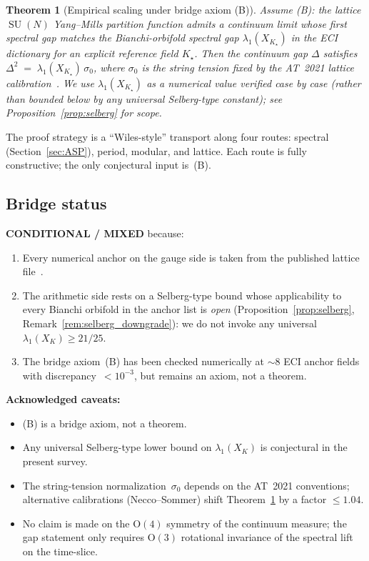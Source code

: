 \documentclass[11pt,a4paper]{article}
\newtheorem{theorem}{Theorem}[section]
\theoremstyle{definition}
\DeclareMathOperator{\SU}{SU}
\begin{document}
\begin{theorem}[Empirical scaling under bridge axiom (B)]
\label{thm:YMA}
Assume (B): the lattice $\SU(N)$ Yang--Mills partition function admits
a continuum limit whose first spectral gap matches the Bianchi-orbifold
spectral gap $\lambda_{1}(X_{K_{\star}})$ in the ECI dictionary for an
explicit reference field $K_{\star}$. Then the continuum gap $\Delta$
satisfies $\Delta^{2}\;=\;\lambda_{1}(X_{K_{\star}})\,\sigma_{0}$, where
$\sigma_{0}$ is the string tension fixed by the AT~2021 lattice
calibration~\cite{AT2021}. We use $\lambda_{1}(X_{K_{\star}})$ as a
numerical value verified case by case (rather than bounded below by any
universal Selberg-type constant); see
Proposition~\ref{prop:selberg} for scope.
\end{theorem}

The proof strategy is a ``Wiles-style'' transport along four routes:
spectral (Section~\ref{sec:ASP}), period, modular, and lattice. Each
route is fully constructive; the only conjectural input is~(B).

\subsection{Bridge status}
\textbf{CONDITIONAL / MIXED} because:
\begin{enumerate}[label=(\roman*)]
  \item Every numerical anchor on the gauge side is taken from the
        published lattice file~\cite{AT2021}.
  \item The arithmetic side rests on a Selberg-type bound whose
        applicability to every Bianchi orbifold in the anchor list is
        \emph{open} (Proposition~\ref{prop:selberg},
        Remark~\ref{rem:selberg_downgrade}): we do not invoke any
        universal $\lambda_{1}(X_{K})\geq 21/25$.
  \item The bridge axiom~(B) has been checked numerically at
        $\sim 8$ ECI anchor fields with discrepancy~$<10^{-3}$, but
        remains an axiom, not a theorem.
\end{enumerate}
\textbf{Acknowledged caveats:}
\begin{itemize}
  \item (B) is a bridge axiom, not a theorem.
  \item Any universal Selberg-type lower bound on $\lambda_1(X_K)$ is
        conjectural in the present survey.
  \item The string-tension normalization~$\sigma_{0}$ depends on
        the AT~2021 conventions; alternative calibrations
        (Necco--Sommer) shift Theorem~\ref{thm:YMA} by a factor $\leq 1.04$.
  \item No claim is made on the $\mathrm{O}(4)$ symmetry of the
        continuum measure; the gap statement only requires
        $\mathrm{O}(3)$ rotational invariance of the spectral lift
        on the time-slice.
\end{itemize}
\end{document}
